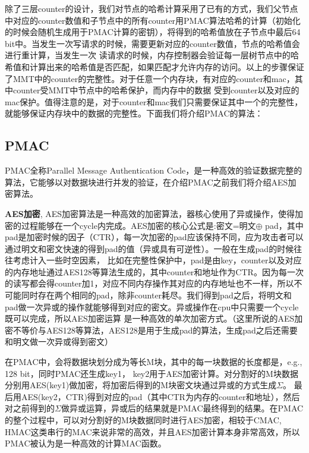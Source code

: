 除了三层counter的设计，我们对节点的哈希计算采用了已有的方式，我们父节点中对应的counter数值和子节点中的所有counter用PMAC算法哈希的计算（初始化的时候会随机生成用于PMAC计算的密钥），将得到的哈希值放在子节点中最后64 bit中。当发生一次写请求的时候，需要更新对应的counter数值，节点的哈希值会进行重计算，当发生一次
读请求的时候，内存控制器会验证每一层树节点中的哈希值和计算出来的哈希值是否匹配，如果匹配才允许内存的访问。以上的步骤保证了MMT中的counter的完整性。对于任意一个内存块，有对应的counter和mac，其中counter受MMT中节点中的哈希保护，而内存中的数据
受到counter以及对应的mac保护。值得注意的是，对于counter和mac我们只需要保证其中一个的完整性，就能够保证内存块中的数据的完整性。下面我们将介绍PMAC的算法：

\subsection{PMAC}
PMAC全称Parallel Message Authentication Code，是一种高效的验证数据完整的算法，它能够以对数据块进行并发的验证，在介绍PMAC之前我们将介绍AES加密算法。

\textbf{AES加密}, AES加密算法是一种高效的加密算法，器核心使用了异或操作，使得加密的过程能够在一个cycle内完成。AES加密的核心公式是:密文=明文$\oplus$ pad，其中pad是加密时候的因子（CTR），每一次加密的pad应该保持不同，应为攻击者可以通过明文和密文快速的得到pad的值（异或具有可逆性）。一般在生成pad的时候往往考虑计入一些时空因素，
比如在完整性保护中，pad是由key，counter以及对应的内存地址通过AES128等算法生成的，其中counter和地址作为CTR。因为每一次的读写都会得counter加1，对应不同内存操作其对应的内存地址也不一样，所以不可能同时存在两个相同的pad，除非counter耗尽。我们得到pad之后，将明文和pad做一次异或的操作就能够得到对应的密文。异或操作在cpu中只需要一个cycle既可以完成，所以AES加密运算
是一种高效的单次加密方式。（这里所说的AES加密不等价与AES128等算法，AES128是用于生成pad的算法，生成pad之后还需要和明文做一次异或得到密文）

在PMAC中，会将数据块划分成为等长M块，其中的每一块数据的长度都是，e.g., 128 bit，同时PMAC还生成key1， key2用于AES加密计算。对分割好的M块数据分别用AES(key1)做加密，将加密后得到的M块密文块通过异或的方式生成$\Sigma$。
最后用AES(key2，CTR)得到对应的pad（其中CTR为内存的counter和地址），然后对之前得到的$\Sigma$做异或运算，异或后的结果就是PMAC最终得到的结果。在PMAC的整个过程中，可以对分割好的M块数据同时进行AES加密，相较于CMAC, HMAC这类串行的MAC来说非常的高效，并且AES加密计算本身非常高效，所以PMAC被认为是一种高效的计算MAC函数。

